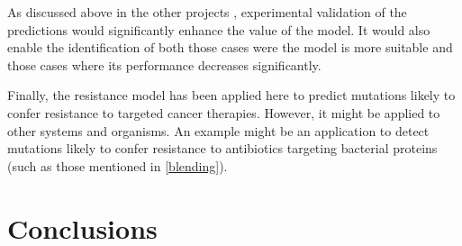 \documentclass[11pt, b5paper,twoside]{tesi_upf}
\begin{document}
\par As discussed above in the other projects , experimental validation of the predictions would significantly enhance the value of the model. It would also enable the identification of both those cases were the model is more suitable and those cases where its performance decreases significantly.
\par Finally, the resistance model has been applied here to predict mutations likely to confer resistance to targeted cancer therapies. However, it might be applied to other systems and organisms. An example might be an application to detect mutations likely to confer resistance to antibiotics targeting bacterial proteins (such as those mentioned in \cref{blending}).  

\clearpage
\section{Conclusions}
 
 
\end{document}

